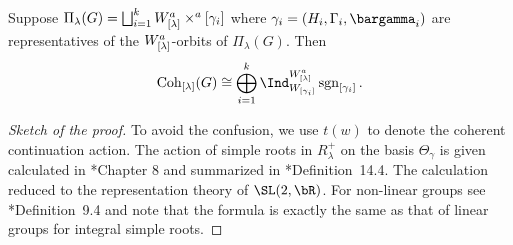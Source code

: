 \documentclass[counting_main.tex]{subfiles}
\begin{document}
\begin{thm}
  \label{thm:cohHC}
  Suppose $\Pi_{\lambda}(G) = \bigsqcup_{i=1}^{k} W^a_{[\lambda]}\times^a [\gamma_{i}]$
  where $\gamma_{i}=(H_{i},\Gamma_{i},\bargamma_{i})$ are representatives of the
  $W^a_{[\lambda]}$-orbits of $\Pi_{\lambda}(G)$. Then
  \[
    \Coh_{[\lambda]}(G) \cong \bigoplus_{i=1}^{k}
    \Ind_{W_{[\gamma_{i}]}}^{\Wlama} \sgn_{[\gamma_{i}]}.
  \]
\end{thm}
\begin{proof}[Sketch of the proof]
  To avoid the confusion, we use $t(w)$ to denote the coherent continuation
  action.
  The action of simple roots in $R^{+}_{\lambda}$ on the basis $\Theta_{\gamma}$
  is given calculated in \cite{Vg}*{Chapter 8} and summarized in
  \cite{V4}*{Definition~14.4}. The calculation reduced to the representation
  theory of $\SL(2,\bR)$.
  For non-linear groups see \cite{RT3}*{Definition~9.4} and note that
  the formula is exactly the same as that of linear groups for integral simple
  roots.
\end{proof}
\end{document}
